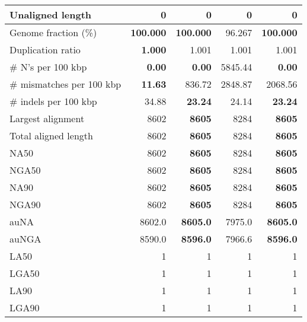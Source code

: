 \documentclass[12pt,a4paper]{article}
\begin{document}
\begin{table}[ht]
\begin{center}
\begin{tabular}{|l*{4}{|r}|}
Unaligned length & 0 & 0 & 0 & 0 \\ \hline
Genome fraction (\%) & {\bf 100.000} & {\bf 100.000} & 96.267 & {\bf 100.000} \\ \hline
Duplication ratio & {\bf 1.000} & 1.001 & 1.001 & 1.001 \\ \hline
\# N's per 100 kbp & {\bf 0.00} & {\bf 0.00} & 5845.44 & {\bf 0.00} \\ \hline
\# mismatches per 100 kbp & {\bf 11.63} & 836.72 & 2848.87 & 2068.56 \\ \hline
\# indels per 100 kbp & 34.88 & {\bf 23.24} & 24.14 & {\bf 23.24} \\ \hline
Largest alignment & 8602 & {\bf 8605} & 8284 & {\bf 8605} \\ \hline
Total aligned length & 8602 & {\bf 8605} & 8284 & {\bf 8605} \\ \hline
NA50 & 8602 & {\bf 8605} & 8284 & {\bf 8605} \\ \hline
NGA50 & 8602 & {\bf 8605} & 8284 & {\bf 8605} \\ \hline
NA90 & 8602 & {\bf 8605} & 8284 & {\bf 8605} \\ \hline
NGA90 & 8602 & {\bf 8605} & 8284 & {\bf 8605} \\ \hline
auNA & 8602.0 & {\bf 8605.0} & 7975.0 & {\bf 8605.0} \\ \hline
auNGA & 8590.0 & {\bf 8596.0} & 7966.6 & {\bf 8596.0} \\ \hline
LA50 & 1 & 1 & 1 & 1 \\ \hline
LGA50 & 1 & 1 & 1 & 1 \\ \hline
LA90 & 1 & 1 & 1 & 1 \\ \hline
LGA90 & 1 & 1 & 1 & 1 \\ \hline
\end{tabular}
\end{center}
\end{table}
\end{document}
